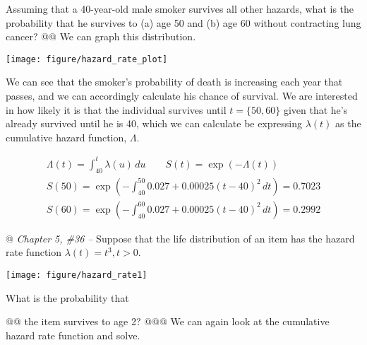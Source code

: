 \documentclass[10pt]{article}\usepackage[]{graphicx}\usepackage[]{xcolor}
\makeatletter
\def\maxwidth{ %
  \ifdim\Gin@nat@width>\linewidth
    \linewidth
  \else
    \Gin@nat@width
  \fi
}
\newenvironment{knitrout}{}{} %
\makeatother
\begin{document}
\begin{easylist}[enumerate]
    Assuming that a 40-year-old male smoker survives all other hazards, what is the probability that he survives to (a)
    age 50 and (b) age 60 without contracting lung cancer?
    @@ We can graph this distribution.

\begin{knitrout}
\color{fgcolor}

{\centering \texttt{[image: figure/hazard\_rate\_plot]} 

}



\end{knitrout}


    We can see that the smoker's probability of death is increasing each year that passes, and we can accordingly
    calculate his chance of survival. We are interested in how likely it is that the individual survives until
    $t=\{50,60\}$ given that he's already survived until he is 40, which we can calculate be expressing $\lambda(t)$ as
    the cumulative hazard function, $\Lambda$.

    \[
        \begin{aligned}
            \Lambda(t) = \int^t_{40} \lambda(u) \, du \qquad S(t) = \exp(-\Lambda(t))\\
            S(50) = \exp\left({-\int_{40}^{50} 0.027 + 0.00025{\left( t - 40 \right)}^2 \, dt}\right) =
                \boxed{0.7023}\\
            S(60) = \exp\left({-\int_{40}^{60} 0.027 + 0.00025{\left( t - 40 \right)}^2 \, dt}\right) =
                \boxed{0.2992}
        \end{aligned}
    \]

    @ \textit{Chapter 5, \#36 --} Suppose that the life distribution of an item has the hazard rate function $\lambda(t)
    = t^3, t > 0$.

\begin{knitrout}
\color{fgcolor}

{\centering \texttt{[image: figure/hazard\_rate1]} 

}



\end{knitrout}


    What is the probability that

    @@ the item survives to age 2?
    @@@ We can again look at the cumulative hazard rate function and solve.


\end{easylist}
\end{document}
